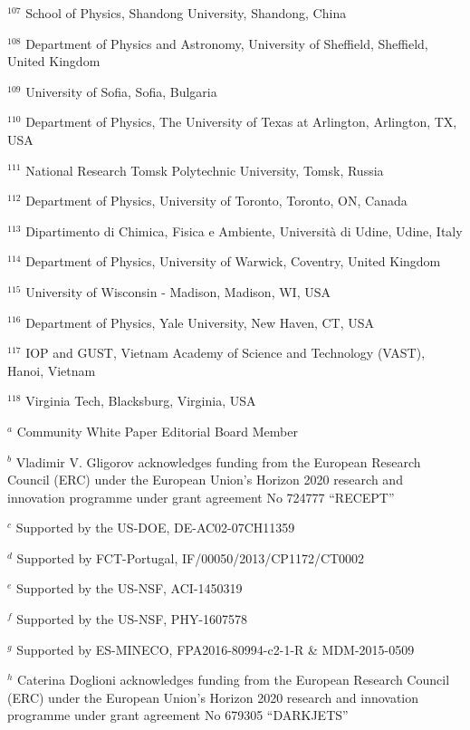 \par {\footnotesize $^{107}$ School of Physics, Shandong University, Shandong, China}
\par {\footnotesize $^{108}$ Department of Physics and Astronomy, University of Sheffield, Sheffield, United Kingdom}
\par {\footnotesize $^{109}$ University of Sofia, Sofia, Bulgaria}
\par {\footnotesize $^{110}$ Department of Physics, The University of Texas at Arlington, Arlington, TX, USA}
\par {\footnotesize $^{111}$ National Research Tomsk Polytechnic University, Tomsk, Russia}
\par {\footnotesize $^{112}$ Department of Physics, University of Toronto, Toronto, ON, Canada}
\par {\footnotesize $^{113}$ Dipartimento di Chimica, Fisica e Ambiente, Università di Udine, Udine, Italy}
\par {\footnotesize $^{114}$ Department of Physics, University of Warwick, Coventry, United Kingdom}
\par {\footnotesize $^{115}$ University of Wisconsin - Madison, Madison, WI, USA}
\par {\footnotesize $^{116}$ Department of Physics, Yale University, New Haven, CT, USA}
\par {\footnotesize $^{117}$ IOP and GUST, Vietnam Academy of Science and Technology (VAST), Hanoi, Vietnam}
\par {\footnotesize $^{118}$ Virginia Tech, Blacksburg, Virginia, USA}
\bigskip
\par {\footnotesize $^{a}$ Community White Paper Editorial Board Member}
\par {\footnotesize $^{b}$ Vladimir V. Gligorov acknowledges funding from the European Research Council (ERC) under the European Union's Horizon 2020 research and innovation programme under grant agreement No 724777 “RECEPT”}
\par {\footnotesize $^{c}$ Supported by the US-DOE, DE-AC02-07CH11359}
\par {\footnotesize $^{d}$ Supported by FCT-Portugal, IF/00050/2013/CP1172/CT0002}
\par {\footnotesize $^{e}$ Supported by the US-NSF, ACI-1450319}
\par {\footnotesize $^{f}$ Supported by the US-NSF, PHY-1607578}
\par {\footnotesize $^{g}$ Supported by ES-MINECO, FPA2016-80994-c2-1-R \& MDM-2015-0509}
\par {\footnotesize $^{h}$ Caterina Doglioni acknowledges funding from the European Research Council (ERC) under the European Union's Horizon 2020 research and innovation programme under grant agreement No 679305 “DARKJETS”}
